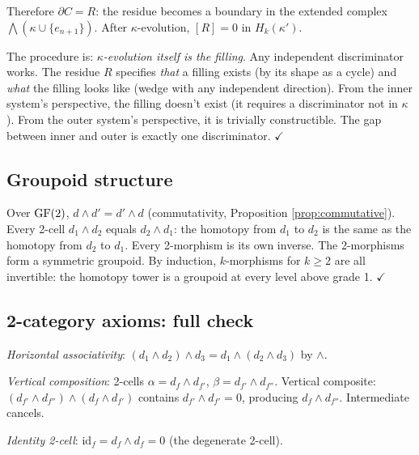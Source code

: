 Therefore $\partial C = R$: the residue becomes a boundary
in the extended complex $\bigwedge(\kappa \cup \{e_{n+1}\})$.
After $\kappa$-evolution, $[R] = 0$ in $H_k(\kappa')$.

The procedure is: \emph{$\kappa$-evolution itself is the
filling}. Any independent discriminator works. The residue
$R$ specifies \emph{that} a filling exists (by its shape
as a cycle) and \emph{what} the filling looks like (wedge
with any independent direction). From the inner system's
perspective, the filling doesn't exist (it requires a
discriminator not in $\kappa$). From the outer system's
perspective, it is trivially constructible. The gap
between inner and outer is exactly one discriminator.
$\checkmark$

\subsection{Groupoid structure}
\label{app:groupoid-full}

Over $\operatorname{GF}(2)$, $d \wedge d' = d' \wedge d$ (commutativity,
Proposition \ref{prop:commutative}). Every 2-cell
$d_1 \wedge d_2$ equals $d_2 \wedge d_1$: the homotopy
from $d_1$ to $d_2$ is the same as the homotopy from
$d_2$ to $d_1$. Every 2-morphism is its own inverse.
The 2-morphisms form a symmetric groupoid. By induction,
$k$-morphisms for $k \geq 2$ are all invertible:
the homotopy tower is a groupoid at every level above
grade 1. $\checkmark$

\subsection{2-category axioms: full check}
\label{app:2cat-full}

\emph{Horizontal associativity}: $(d_1 \wedge d_2) \wedge
d_3 = d_1 \wedge (d_2 \wedge d_3)$ by $\wedge$.

\emph{Vertical composition}: 2-cells
$\alpha = d_f \wedge d_{f'}$, $\beta = d_{f'} \wedge d_{f''}$.
Vertical composite: $(d_{f'} \wedge d_{f''}) \wedge
(d_f \wedge d_{f'})$ contains $d_{f'} \wedge d_{f'} = 0$,
producing $d_f \wedge d_{f''}$. Intermediate cancels.

\emph{Identity 2-cell}: $\mathrm{id}_f = d_f \wedge d_f = 0$
(the degenerate 2-cell).


